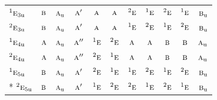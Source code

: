 \documentclass[10pt,a4paper]{article}
\numberwithin{equation}{section}
\newcommand{\irr}[1]{\text{\normalfont\scshape #1}}
\newcommand{\conjpair}[1]{{}^{#1}}
\newcommand{\ptag}[1]{\mathrm{#1}}
\begin{document}
{\begin{longtable}{@{}lcccccccccc@{}}
$\conjpair{1}\irr{e}_{3\ptag{u}}$ & $\irr{b}$ & $\irr{a}_{\ptag{u}}$ & $\irr{a}'$ & $\irr{a}$ & $\irr{a}$ & $\conjpair{2}\irr{e}$ & $\conjpair{1}\irr{e}$ & $\conjpair{2}\irr{e}$ & $\conjpair{1}\irr{e}$ & $\irr{b}_{\ptag{u}}$\\
$\conjpair{2}\irr{e}_{3\ptag{u}}$ & $\irr{b}$ & $\irr{a}_{\ptag{u}}$ & $\irr{a}'$ & $\irr{a}$ & $\irr{a}$ & $\conjpair{1}\irr{e}$ & $\conjpair{2}\irr{e}$ & $\conjpair{1}\irr{e}$ & $\conjpair{2}\irr{e}$ & $\irr{b}_{\ptag{u}}$\\
$\conjpair{1}\irr{e}_{4\ptag{u}}$ & $\irr{a}$ & $\irr{a}_{\ptag{u}}$ & $\irr{a}''$ & $\conjpair{1}\irr{e}$ & $\conjpair{2}\irr{e}$ & $\irr{a}$ & $\irr{a}$ & $\irr{b}$ & $\irr{b}$ & $\irr{a}_{\ptag{u}}$\\
$\conjpair{2}\irr{e}_{4\ptag{u}}$ & $\irr{a}$ & $\irr{a}_{\ptag{u}}$ & $\irr{a}''$ & $\conjpair{2}\irr{e}$ & $\conjpair{1}\irr{e}$ & $\irr{a}$ & $\irr{a}$ & $\irr{b}$ & $\irr{b}$ & $\irr{a}_{\ptag{u}}$\\
$\conjpair{1}\irr{e}_{5\ptag{u}}$ & $\irr{b}$ & $\irr{a}_{\ptag{u}}$ & $\irr{a}'$ & $\conjpair{2}\irr{e}$ & $\conjpair{1}\irr{e}$ & $\conjpair{1}\irr{e}$ & $\conjpair{2}\irr{e}$ & $\conjpair{1}\irr{e}$ & $\conjpair{2}\irr{e}$ & $\irr{b}_{\ptag{u}}$\\*
$\conjpair{2}\irr{e}_{5\ptag{u}}$ & $\irr{b}$ & $\irr{a}_{\ptag{u}}$ & $\irr{a}'$ & $\conjpair{1}\irr{e}$ & $\conjpair{2}\irr{e}$ & $\conjpair{2}\irr{e}$ & $\conjpair{1}\irr{e}$ & $\conjpair{2}\irr{e}$ & $\conjpair{1}\irr{e}$ & $\irr{b}_{\ptag{u}}$\\
\bottomrule\end{longtable}}
\end{document}
